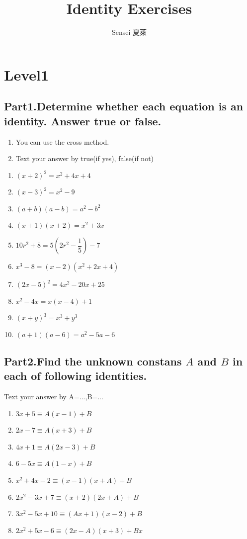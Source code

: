 \documentclass[12pt,a4paper,]{article}
\title{Identity Exercises}
\author{Sensei \textperiodcentered 夏萊}
\date{}
\begin{document}
	\maketitle
	\section{Level1}
	\subsection*{Part1.Determine whether each equation is an identity. Answer true or false.}
	\begin{enumerate}
		\item You can use the cross method.
		\item Text your answer by true(if yes), false(if not)
	\end{enumerate}
	\begin{enumerate}
		\item $(x+2)^2 = x^2 +4x +4$
		\item $(x-3)^2 = x^2 -9$
		\item $(a+b)(a-b)=a^2-b^2$
		\item $(x+1)(x+2)=x^2+3x$
		\item $10r^2+8=5(2r^2-\dfrac{1}{5})-7$
		\item $x^3-8=(x-2)(x^2+2x+4)$
		\item $(2x-5)^2=4x^2-20x+25$
		\item $x^2-4x = x(x-4)+1$
		\item $(x+y)^3 = x^3+y^3$
		\item $(a+1)(a-6)=a^2-5a-6$
	\end{enumerate}
	\newpage
	\subsection*{Part2.Find the unknown constans $A$ and $B$ in each of following identities.}
	Text your answer by A=...,B=...
	\begin{enumerate}
		\item $3x+5 \equiv A(x-1)+B$
		\item $2x-7 \equiv A(x+3)+B$
		\item $4x+1 \equiv A(2x-3)+B$
		\item $6-5x \equiv A(1-x)+B$
		\item $x^2+4x-2 \equiv (x-1)(x+A)+B$
		\item $2x^2-3x+7 \equiv (x+2)(2x+A)+B$
		\item $3x^2-5x+10 \equiv (Ax+1)(x-2)+B$
		\item $2x^2+5x-6 \equiv (2x-A)(x+3)+Bx$
	\end{enumerate}
\end{document}
